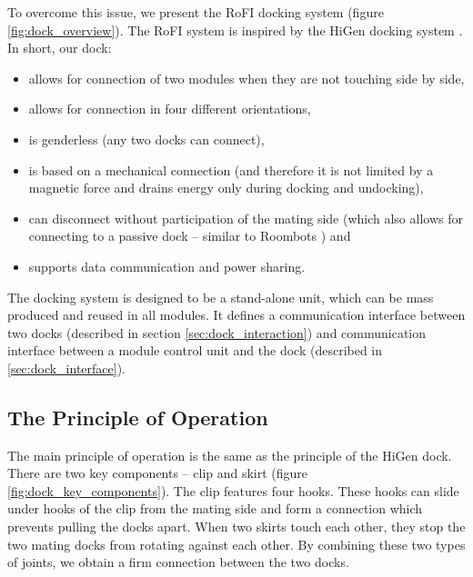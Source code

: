 To overcome this issue, we present the RoFI docking system (figure
\ref{fig:dock_overview}). The RoFI system is inspired by the HiGen docking
system \cite{parrott_higen:_2014}. In short, our dock:
\begin{itemize}
    \item allows for connection of two modules when they are not touching side
    by side,
    \item allows for connection in four different orientations,
    \item is genderless (any two docks can connect),
    \item is based on a mechanical connection (and therefore it is not
    limited by a magnetic force and drains energy only during docking and
    undocking),
    \item can disconnect without participation of the mating side (which also
    allows for connecting to a passive dock -- similar to Roombots
    \cite{bonardi_locomotion_2012}) and
    \item supports data communication and power sharing.
\end{itemize}

The docking system is designed to be a stand-alone unit, which can be mass
produced and reused in all modules. It defines a communication interface between
two docks (described in section \ref{sec:dock_interaction}) and communication
interface between a module control unit and the dock (described in
\ref{sec:dock_interface}).

\subsection{The Principle of Operation}

The main principle of operation is the same as the principle of the HiGen dock.
There are two key components -- clip and skirt (figure
\ref{fig:dock_key_components}). The clip features four hooks. These hooks can
slide under hooks of the clip from the mating side and form a connection which
prevents pulling the docks apart. When two skirts touch each other, they stop
the two mating docks from rotating against each other. By combining these two
types of joints, we obtain a firm connection between the two docks.

